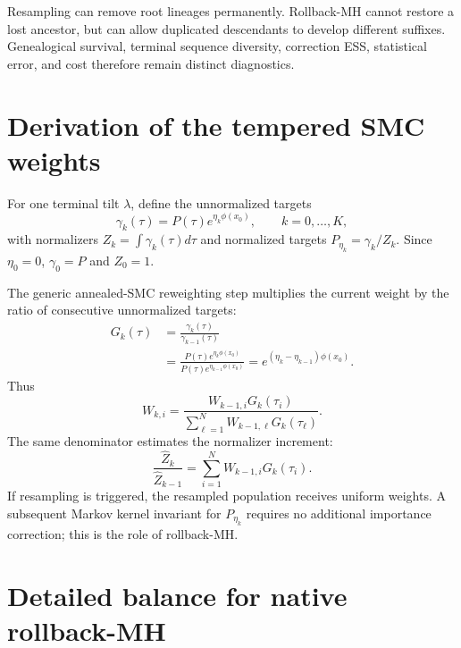 \documentclass{article}
\begin{document}
Resampling can remove root lineages permanently. Rollback-MH cannot restore a
lost ancestor, but can allow duplicated descendants to develop different
suffixes. Genealogical survival, terminal sequence diversity, correction ESS,
statistical error, and cost therefore remain distinct diagnostics.

\section{Derivation of the tempered SMC weights}
\label{app:weights}

For one terminal tilt $\lambda$, define the unnormalized targets
\begin{equation}
\gamma_k(\tau)=P(\tau)e^{\eta_k\phi(x_0)},
\qquad k=0,\ldots,K,
\end{equation}
with normalizers $Z_k=\int\gamma_k(\tau)d\tau$ and normalized targets
$P_{\eta_k}=\gamma_k/Z_k$. Since $\eta_0=0$, $\gamma_0=P$ and $Z_0=1$.

The generic annealed-SMC reweighting step multiplies the current weight by the
ratio of consecutive unnormalized targets:
\begin{align}
G_k(\tau)
&=\frac{\gamma_k(\tau)}{\gamma_{k-1}(\tau)} \\
&=\frac{P(\tau)e^{\eta_k\phi(x_0)}}
{P(\tau)e^{\eta_{k-1}\phi(x_0)}}
=e^{(\eta_k-\eta_{k-1})\phi(x_0)}.
\end{align}
Thus
\begin{equation}
W_{k,i}
=\frac{W_{k-1,i}G_k(\tau_i)}
{\sum_{\ell=1}^{N}W_{k-1,\ell}G_k(\tau_\ell)}.
\end{equation}
The same denominator estimates the normalizer increment:
\begin{equation}
\frac{\widehat Z_k}{\widehat Z_{k-1}}
=\sum_{i=1}^{N}W_{k-1,i}G_k(\tau_i).
\end{equation}
If resampling is triggered, the resampled population receives uniform weights.
A subsequent Markov kernel invariant for $P_{\eta_k}$ requires no additional
importance correction; this is the role of rollback-MH.

\section{Detailed balance for native rollback-MH}
\label{app:rollback}
\end{document}
